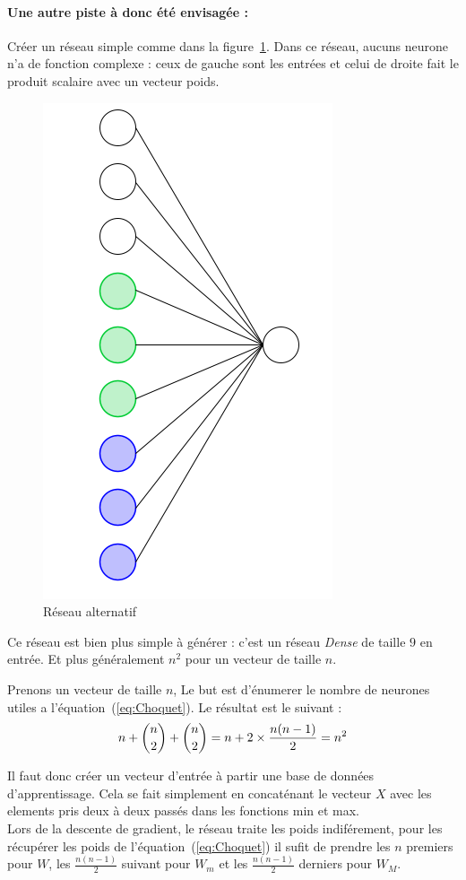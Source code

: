 \paragraph{Une autre piste à donc été envisagée :}
Créer un réseau simple comme dans la figure\ \ref{fig:net3}.
Dans ce réseau, aucuns neurone n'a de fonction complexe :
ceux de gauche sont les entrées et
celui de droite fait le produit scalaire avec un vecteur poids.
\begin{figure}[H]
    \center
    \includegraphics[height=\petit]{pict/net3.png}
	\caption{Réseau alternatif}
	\label{fig:net3}
\end{figure}
\vspace{-12pt}
Ce réseau est bien plus simple à générer : c'est un réseau \emph{Dense} de taille $9$ en entrée.
Et plus généralement $n^2$ pour un vecteur de taille $n$.


{
Prenons un vecteur de taille $n$,
Le but est d'énumerer le nombre de neurones utiles a l'équation\ (\ref{eq:Choquet}).
Le résultat est le suivant :
\begin{equation}
    n + \dbinom{n}{2} + \dbinom{n}{2} = n + 2 \times \frac{n(n-1)}{2} = n^2
\end{equation}
}

Il faut donc créer un vecteur d'entrée à partir une base de données d'apprentissage.
Cela se fait simplement en concaténant le vecteur $X$ avec les elements pris deux à deux passés
dans les fonctions min et max.\\


Lors de la descente de gradient, le réseau traite les poids indiférement,
pour les récupérer les poids de l'équation\ (\ref{eq:Choquet})
il sufit de prendre les $n$ premiers pour $W$,
les $\frac{n(n-1)}{2}$ suivant pour $W_m$
et les $\frac{n(n-1)}{2}$ derniers pour $W_M$.
